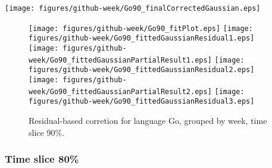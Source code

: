 \begin{center}
{\texttt{[image: figures/github-week/Go90\_finalCorrectedGaussian.eps]}}
\end{center}

\FloatBarrier

\begin{figure}[t]
\centering
{}
{\texttt{[image: figures/github-week/Go90\_fitPlot.eps]}}
{\texttt{[image: figures/github-week/Go90\_fittedGaussianResidual1.eps]}}
{\texttt{[image: figures/github-week/Go90\_fittedGaussianPartialResult1.eps]}}
{\texttt{[image: figures/github-week/Go90\_fittedGaussianResidual2.eps]}}
{\texttt{[image: figures/github-week/Go90\_fittedGaussianPartialResult2.eps]}}
{\texttt{[image: figures/github-week/Go90\_fittedGaussianResidual3.eps]}}
\caption{Residual-based corretion for language Go, grouped by week, time slice 90\%.}
\end{figure}


\FloatBarrier


\subsubsection{Time slice 80\%}

